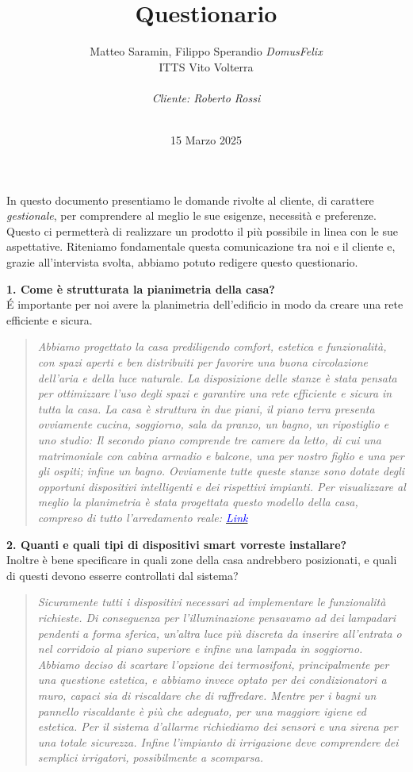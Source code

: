 \documentclass{exam}
\title{\huge{Questionario}}
\author{Matteo Saramin, Filippo Sperandio \textit{DomusFelix} \\ {\small ITTS Vito Volterra} \\ \\ \emph{Cliente: Roberto Rossi}}
\date{\version\\ 15 Marzo 2025}
\begin{document}
\maketitle
\vspace{5mm}
In questo documento presentiamo le domande rivolte al cliente, di carattere \emph{gestionale},
per comprendere al meglio le sue esigenze, necessità e preferenze. 
Questo ci permetterà di realizzare un prodotto il più possibile in linea con le sue aspettative. 
Riteniamo fondamentale questa comunicazione tra noi e il cliente e, grazie all'intervista svolta, abbiamo potuto redigere questo questionario.


\clearpage
\noindent\textbf{1. Come è strutturata la pianimetria della casa?}\\[1.5mm]
É importante per noi avere la planimetria dell'edificio in modo da creare una rete efficiente e sicura.\\
\begin{quote}
    \emph{Abbiamo progettato la casa prediligendo comfort, estetica e funzionalità, con spazi aperti e ben distribuiti per favorire una buona circolazione dell'aria e della luce naturale. La disposizione delle stanze è stata pensata per ottimizzare l'uso degli spazi e garantire una rete efficiente e sicura in tutta la casa. La casa è struttura in due piani, il piano terra presenta ovviamente cucina, soggiorno, sala da pranzo, un bagno, un ripostiglio e uno studio: Il secondo piano comprende tre camere da letto, di cui una matrimoniale con cabina armadio e balcone, una per nostro figlio e una per gli ospiti; infine un bagno. Ovviamente tutte queste stanze sono dotate degli opportuni dispositivi intelligenti e dei rispettivi impianti. Per visualizzare al meglio la planimetria è stata progettata questo modello della casa, compreso di tutto l'arredamento reale: \href{https://gallery.roomsketcher.com/project/?l=en&pid=14670259}{\textcolor{blue}{Link}}
    }
\end{quote}
\clearpage
\noindent\textbf{2. Quanti e quali tipi di dispositivi smart vorreste installare?}\\[1.5mm]
Inoltre è bene specificare in quali zone della casa andrebbero posizionati, e quali di questi devono esserre controllati dal sistema?\\
\begin{quote}
    \emph{Sicuramente tutti i dispositivi necessari ad implementare le funzionalità richieste. Di conseguenza per l'illuminazione pensavamo ad dei lampadari pendenti a forma sferica, un'altra luce più discreta da inserire all'entrata o nel corridoio al piano superiore e infine una lampada in soggiorno. Abbiamo deciso di scartare l'opzione dei termosifoni, principalmente per una questione estetica, e abbiamo invece optato per dei condizionatori a muro, capaci sia di riscaldare che di raffredare. Mentre per i bagni un pannello riscaldante è più che adeguato, per una maggiore igiene ed estetica. Per il sistema d'allarme richiediamo dei sensori e una sirena per una totale sicurezza. Infine l'impianto di irrigazione deve comprendere dei semplici irrigatori, possibilmente a scomparsa.}
\end{quote}
\end{document}
